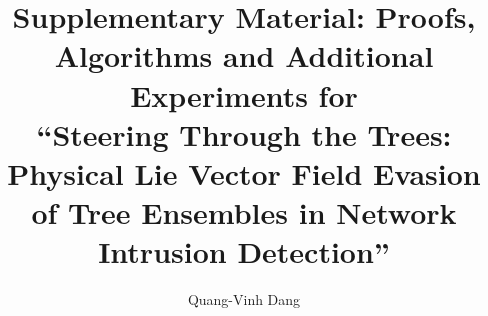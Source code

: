 \documentclass[12pt]{article}
\title{Supplementary Material: Proofs, Algorithms and Additional Experiments for\\ ``Steering Through the Trees: Physical Lie Vector Field Evasion of Tree Ensembles in Network Intrusion Detection''}
\author{Quang-Vinh Dang}
\date{}
\begin{document}
\sloppy
\maketitle


\end{document}
